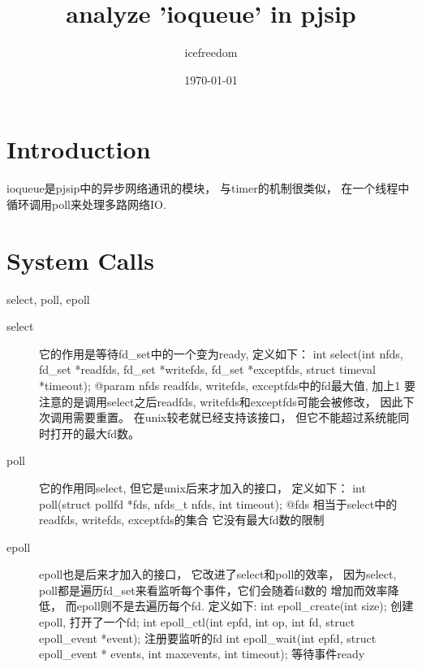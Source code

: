 \documentclass[a4paper, 12pt]{article}
\title{analyze 'ioqueue' in pjsip}
\author{icefreedom}
\date{\today}
\begin{document}
\maketitle

\begin{CJK}{UTF8}{gkai}

\section{Introduction}
ioqueue是pjsip中的异步网络通讯的模块， 与timer的机制很类似， 在一个线程中循环调用poll来处理多路网络IO.

\section{System Calls}
select, poll, epoll
\begin{description}
\item[select]
它的作用是等待fd\_set中的一个变为ready, 定义如下：
int select(int nfds, fd\_set *readfds, fd\_set *writefds,
           fd\_set *exceptfds, struct timeval *timeout);
	@param nfds readfds, writefds,  exceptfds中的fd最大值, 加上1
	要注意的是调用select之后readfds, writefds和exceptfds可能会被修改， 因此下次调用需要重置。
	在unix较老就已经支持该接口， 但它不能超过系统能同时打开的最大fd数。
 \item[poll]
它的作用同select, 但它是unix后来才加入的接口， 定义如下：
int poll(struct pollfd *fds, nfds\_t nfds, int timeout);
	@fds 相当于select中的readfds, writefds, exceptfds的集合
	它没有最大fd数的限制
\item[epoll]
epoll也是后来才加入的接口， 它改进了select和poll的效率， 因为select, poll都是遍历fd\_set来看监听每个事件，它们会随着fd数的
增加而效率降低， 而epoll则不是去遍历每个fd. 定义如下:
 int epoll\_create(int size);  创建epoll, 打开了一个fd;
int epoll\_ctl(int epfd, int op, int fd, struct epoll\_event *event); 注册要监听的fd
int epoll\_wait(int epfd, struct epoll\_event * events, int maxevents, int timeout); 等待事件ready
\end{description}


\end{CJK}
\end{document}
